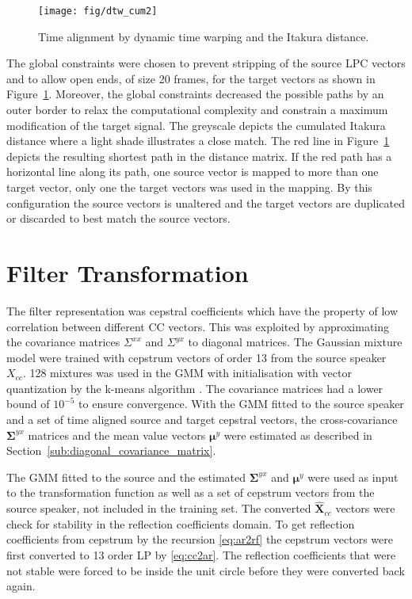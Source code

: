 \begin{figure}[htbp]
	\begin{center}
		\texttt{[image: fig/dtw\_cum2]}
		\caption{Time alignment by dynamic time warping and the Itakura distance.}
		\label{fig:dtw}
	\end{center}
\end{figure}
The global constraints were chosen to prevent stripping of the source LPC vectors and to allow open ends, of size 20 frames, for the target vectors as shown in Figure~\ref{fig:dtw}. Moreover, the global constraints decreased the possible paths by an outer border to relax the computational complexity and constrain a maximum modification of the target signal. The greyscale depicts the cumulated Itakura distance where a light shade illustrates a close match. The red line in Figure~\ref{fig:dtw} depicts the resulting shortest path in the distance matrix. If the red path has a horizontal line along its path, \ie one source vector is mapped to more than one target vector, only one the target vectors was used in the mapping. By this configuration the source vectors is unaltered and the target vectors are duplicated or discarded to best match the source vectors.



\section{Filter Transformation} %
\label{sec:filter_transformation}

The filter representation was cepstral coefficients which have the property of low correlation between different CC vectors. This was exploited by approximating the covariance matrices $\Sigma^{xx}$ and $\Sigma^{yx}$ to diagonal matrices. The Gaussian mixture model were trained with cepstrum vectors of order 13 from the source speaker $X_{cc}$. 128 mixtures was used in the GMM with initialisation with vector quantization by the k-means algorithm \cite{linde80}. The covariance matrices had a lower bound of $10^{-5}$ to ensure convergence. With the GMM fitted to the source speaker and a set of time aligned source and target cepstral vectors, the cross-covariance $\mathbf{\Sigma}^{yx}$ matrices and the mean value vectors $\boldsymbol{\mu}^y$ were estimated as described in Section~\ref{sub:diagonal_covariance_matrix}.

The GMM fitted to the source and the estimated $\mathbf{\Sigma}^{yx}$ and $\boldsymbol{\mu}^y$ were used as input to the transformation function as well as a set of cepstrum vectors from the source speaker, not included in the training set. The converted $\mathbf{\hat{X}}_{cc}$ vectors were check for stability in the reflection coefficients domain. To get reflection coefficients from cepstrum by the recursion \eqref{eq:ar2rf} the cepstrum vectors were first converted to 13 order LP by \eqref{eq:cc2ar}. The reflection coefficients that were not stable were forced to be inside the unit circle before they were converted back again. 

